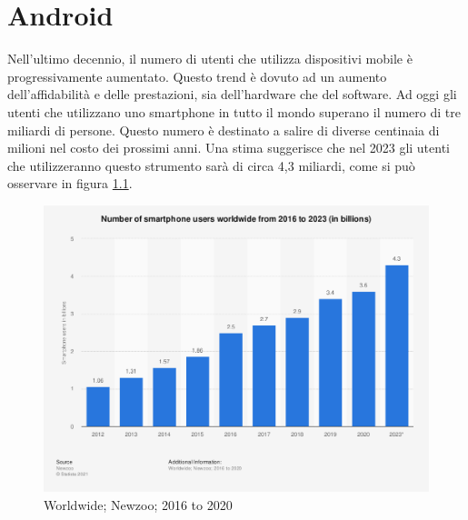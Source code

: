
\chapter{Android}
\label{chap:cap2}

Nell'ultimo decennio, il numero di utenti che utilizza dispositivi mobile è progressivamente aumentato. Questo trend è dovuto ad un aumento dell'affidabilità e delle prestazioni, sia dell'hardware che del software. Ad oggi gli utenti che utilizzano uno smartphone in tutto il mondo superano il numero di tre miliardi di persone. Questo numero è destinato a salire di diverse centinaia di milioni nel costo dei prossimi anni. Una stima suggerisce che nel 2023 gli utenti che utilizzeranno questo strumento sarà di circa 4,3 miliardi\cite{numberofuser}, come si può osservare in figura \ref{fig:WordwideNewzoo}.
\begin{figure}[h]
\centering 
\includegraphics[width=0.7\linewidth]{imgs/capitolo2/intro/statistic_id330695_smartphone-users-worldwide-2016-2023.png} 
\caption{ Worldwide; Newzoo; 2016 to 2020} 
\label{fig:WordwideNewzoo} 
\end{figure}


